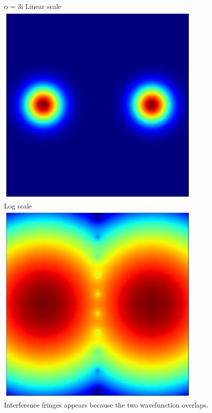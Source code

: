 \documentclass[10pt,fleqn]{article}
\newcommand{\ui}{\mathrm{i}}
\begin{document}
\subsection{}
$\alpha=3\ui$
Linear scale\\
\includegraphics[width=10cm]{3-2-lin.png}\\
Log scale\\
\includegraphics[width=10cm]{3-2-log.png}\\
Interference fringes appears because the two wavefunction overlaps.
\end{document}
